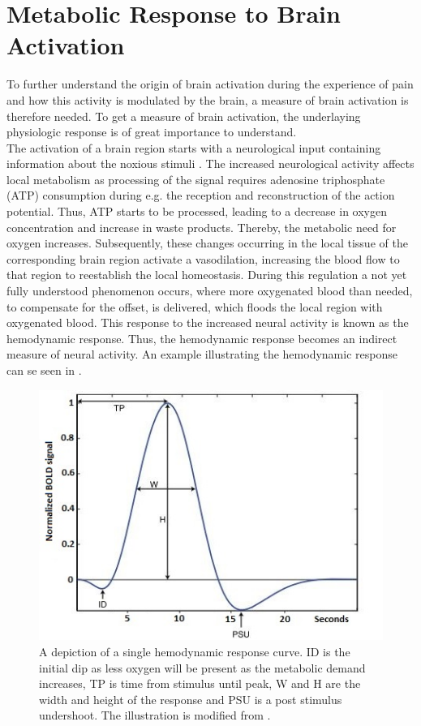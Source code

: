 
\section{Metabolic Response to Brain Activation} \label{sec:pain}

To further understand the origin of brain activation during the experience of pain and how this activity is modulated by the brain, a measure of brain activation is therefore needed. To get a measure of brain activation, the underlaying physiologic response is of great importance to understand. \\
The activation of a brain region starts with a neurological input containing information about the noxious stimuli \cite{Tracey2007}. The increased neurological activity affects local metabolism as processing of the signal requires adenosine triphosphate (ATP) consumption during e.g. the reception and reconstruction of the action potential. Thus, ATP starts to be processed, leading to a decrease in oxygen concentration and increase in waste products. Thereby, the metabolic need for oxygen increases. Subsequently, these changes occurring in the local tissue of the corresponding brain region activate a vasodilation, increasing the blood flow to that region to reestablish the local homeostasis. During this regulation a not yet fully understood phenomenon occurs, where more oxygenated blood than needed, to compensate for the offset, is delivered, which floods the local region with oxygenated blood. This response to the increased neural activity is known as the hemodynamic response. Thus, the hemodynamic response becomes an indirect measure of neural activity. \cite{Glover2011,Poldrack2011}  %
An example illustrating the hemodynamic response can se seen in .

\begin{figure}[H]                 
	\includegraphics[width=.48\textwidth]{figures/aBackground/HRF}  
	\caption{A depiction of a single hemodynamic response curve. ID is the initial dip as less oxygen will be present as the metabolic demand increases, TP is time from stimulus until peak, W and H are the width and height of the response and PSU is a post stimulus undershoot. The illustration is modified from \cite{Poldrack2011}.}
	\label{fig:back:HRF} 
\end{figure}

